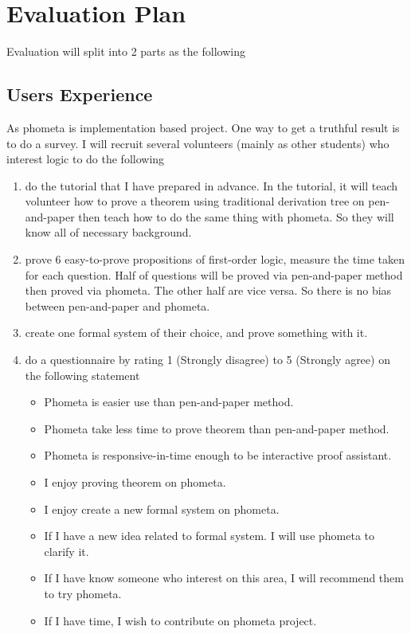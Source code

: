 \documentclass[master.tex]{subfiles}
\begin{document}
\chapter{Evaluation Plan}

Evaluation will split into 2 parts as the following

\section{Users Experience}

As phometa is implementation based project. One way to get a truthful result is to do a survey. I will recruit several volunteers (mainly as other students) who interest logic to do the following

\begin{enumerate}
    \item do the tutorial that I have prepared in advance. In the tutorial, it will teach volunteer how to prove a theorem using traditional derivation tree on pen-and-paper then teach how to do the same thing with phometa. So they will know all of necessary background.
    \item prove 6 easy-to-prove propositions of first-order logic, measure the time taken for each question. Half of questions will be proved via pen-and-paper method then proved via phometa. The other half are vice versa. So there is no bias between pen-and-paper and phometa.
    \item create one formal system of their choice, and prove something with it.
    \item do a questionnaire by rating 1 (Strongly disagree) to 5 (Strongly agree) on the following statement
    \begin{itemize}
         \item Phometa is easier use than pen-and-paper method.
         \item Phometa take less time to prove theorem than pen-and-paper method.
         \item Phometa is responsive-in-time enough to be interactive proof assistant.
         \item I enjoy proving theorem on phometa.
         \item I enjoy create a new formal system on phometa.
         \item If I have a new idea related to formal system. I will use phometa to clarify it.
         \item If I have know someone who interest on this area, I will recommend them to try phometa.
         \item If I have time, I wish to contribute on phometa project.
    \end{itemize}
\end{enumerate}
\end{document}
